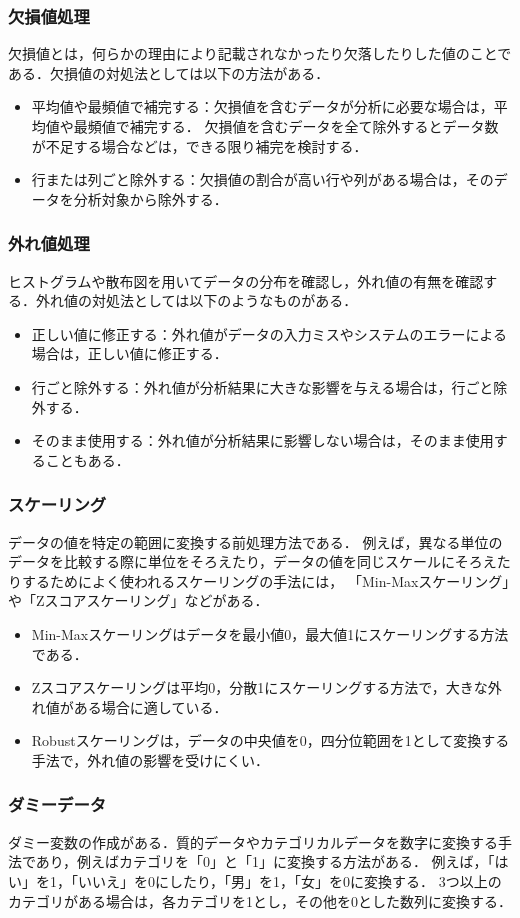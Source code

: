 \documentclass[titlepage,a4paper]{jsarticle}
\begin{document}
\subsubsection{欠損値処理}
欠損値とは，何らかの理由により記載されなかったり欠落したりした値のことである．欠損値の対処法としては以下の方法がある．
\begin{itemize}
  \item 平均値や最頻値で補完する：欠損値を含むデータが分析に必要な場合は，平均値や最頻値で補完する．
        欠損値を含むデータを全て除外するとデータ数が不足する場合などは，できる限り補完を検討する．
  \item 行または列ごと除外する：欠損値の割合が高い行や列がある場合は，そのデータを分析対象から除外する．
\end{itemize}
\subsubsection{外れ値処理}
ヒストグラムや散布図を用いてデータの分布を確認し，外れ値の有無を確認する．外れ値の対処法としては以下のようなものがある．
\begin{itemize}
  \item 正しい値に修正する：外れ値がデータの入力ミスやシステムのエラーによる場合は，正しい値に修正する．
  \item 行ごと除外する：外れ値が分析結果に大きな影響を与える場合は，行ごと除外する．
  \item そのまま使用する：外れ値が分析結果に影響しない場合は，そのまま使用することもある．
\end{itemize}
\subsubsection{スケーリング}
データの値を特定の範囲に変換する前処理方法である．
例えば，異なる単位のデータを比較する際に単位をそろえたり，データの値を同じスケールにそろえたりするためによく使われるスケーリングの手法には，
「Min-Maxスケーリング」や「Zスコアスケーリング」などがある．
\begin{itemize}
  \item Min-Maxスケーリングはデータを最小値0，最大値1にスケーリングする方法である．
  \item Zスコアスケーリングは平均0，分散1にスケーリングする方法で，大きな外れ値がある場合に適している．
  \item Robustスケーリングは，データの中央値を0，四分位範囲を1として変換する手法で，外れ値の影響を受けにくい．
\end{itemize}
\subsubsection{ダミーデータ}
ダミー変数の作成がある．質的データやカテゴリカルデータを数字に変換する手法であり，例えばカテゴリを「0」と「1」に変換する方法がある．
例えば，「はい」を1，「いいえ」を0にしたり，「男」を1，「女」を0に変換する．
3つ以上のカテゴリがある場合は，各カテゴリを1とし，その他を0とした数列に変換する．
\end{document}
